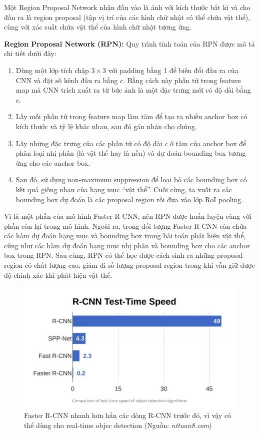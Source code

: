 \documentclass[a4paper, 12pt]{report}
\begin{document}
Một Region Proposal Network nhận đầu vào là ảnh với kích thước bất kì và cho đầu ra là region proposal (tập vị trí của các hình chữ nhật có thể chứa vật thể), cùng với xác suất chứa vật thể của hình chữ nhật tương ứng. \par
\textbf{Region Proposal Network (RPN):} Quy trình tính toán của RPN được mô tả chi tiết dưới đây: 
\begin{enumerate}
	\item Dùng một lớp tích chập $3\times 3$ với padding bằng 1 để biến đổi đầu ra của CNN và đặt số kênh đầu ra bằng $c$. Bằng cách này phần tử trong feature map mà CNN trích xuất ra từ bức ảnh là một đặc trưng mới có độ dài bằng $c$.
	\item Lấy mỗi phần tử trong feature map làm tâm để tạo ra nhiều anchor box có kích thước và tỷ lệ khác nhau, sau đó gán nhãn cho chúng.  
	\item Lấy những đặc trưng của các phần tử có độ dài $c$ ở tâm của anchor box để phân loại nhị phân (là vật thể hay là nền) và dự đoán bounding box tương ứng cho các anchor box.
	\item Sau đó, sử dụng non-maximum suppression để loại bỏ các bounding box có kết quả giống nhau của hạng mục “vật thể”. Cuối cùng, ta xuất ra các bounding box dự đoán là các proposal region rồi đưa vào lớp RoI pooling.
\end{enumerate}
Vì là một phần của mô hình Faster R-CNN, nên RPN được huấn luyện cùng với phần còn lại trong mô hình. Ngoài ra, trong đối tượng Faster R-CNN còn chứa các hàm dự đoán hạng mục và bounding box trong bài toán phát hiện vật thể, cũng như các hàm dự đoán hạng mục nhị phân và bounding box cho các anchor box trong RPN. Sau cùng, RPN có thể học được cách sinh ra những proposal region có chất lượng cao, giảm đi số lượng proposal region trong khi vẫn giữ được độ chính xác khi phát hiện vật thể.\par
\begin{figure}[!h]
	\centering
	\includegraphics[width=0.7\linewidth]{Images/fasterrcnn2}
	\caption{Faster R-CNN nhanh hơn hẳn các dòng R-CNN trước đó, vì vậy có thể dùng cho real-time objec detection (Nguồn: \textit{nttuan8.com})}
	\label{fig:fasterrcnn2}
\end{figure}
\end{document}
